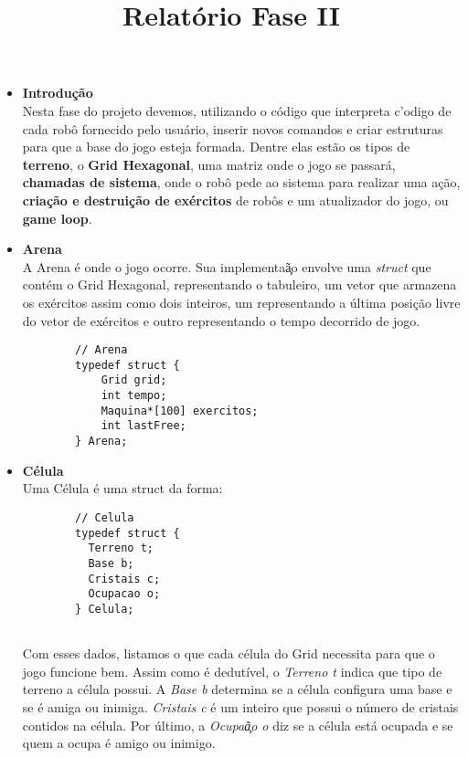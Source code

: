 \documentclass{article}
\begin{document}
\title{Relat\'orio Fase II}
\date{}

\maketitle

\begin{itemize}
    \item \textbf{Introdu\c c\~ao} \\
    Nesta fase do projeto devemos, utilizando o c\'odigo que interpreta c'odigo de cada rob\^o fornecido pelo usu\'ario, inserir novos comandos e criar estruturas para que a base do jogo esteja formada. Dentre elas est\~ao os tipos de \textbf{terreno}, o \textbf{Grid Hexagonal}, uma matriz onde o jogo se passar\'a, \textbf{chamadas de sistema}, onde o rob\^o pede ao sistema para realizar uma a\c c\~ao, \textbf{cria\c c\~ao e destrui\c c\~ao de ex\'ercitos} de rob\^os e um atualizador do jogo, ou \textbf{game loop}.
    
    \item \textbf{Arena} \\
    A Arena \'e onde o jogo ocorre. Sua implementa\c \~ao envolve uma \textit{struct} que cont\'em o Grid Hexagonal, representando o tabuleiro, um vetor que armazena os ex\'ercitos assim como dois inteiros, um representando a \'ultima posi\c c\~ao livre do vetor de ex\'ercitos e outro representando o tempo decorrido de jogo.
    \begin{lstlisting}
        // Arena
        typedef struct {
        	Grid grid;
        	int tempo;
        	Maquina*[100] exercitos;
        	int lastFree;
        } Arena;

    \end{lstlisting}
    \item \textbf{C\'elula} \\
    Uma C\'elula \'e uma struct da forma:
    \begin{lstlisting}
        // Celula
        typedef struct {
          Terreno t;
          Base b;
          Cristais c;
          Ocupacao o;
        } Celula;
    
    \end{lstlisting}
    Com esses dados, listamos o que cada c\'elula do Grid necessita para que o jogo funcione bem. Assim como \'e dedut\'ivel, o \textit{Terreno t} indica que tipo de terreno a c\'elula possui. A \textit{Base b} determina se a c\'elula configura uma base e se \'e amiga ou inimiga. \textit{Cristais c} \'e um inteiro que possui o n\'umero de cristais contidos na c\'elula. Por \'ultimo, a \textit{Ocupa\c \~ao o} diz se a c\'elula est\'a ocupada e se quem a ocupa \'e amigo ou inimigo.
    

\end{itemize}
\end{document}
